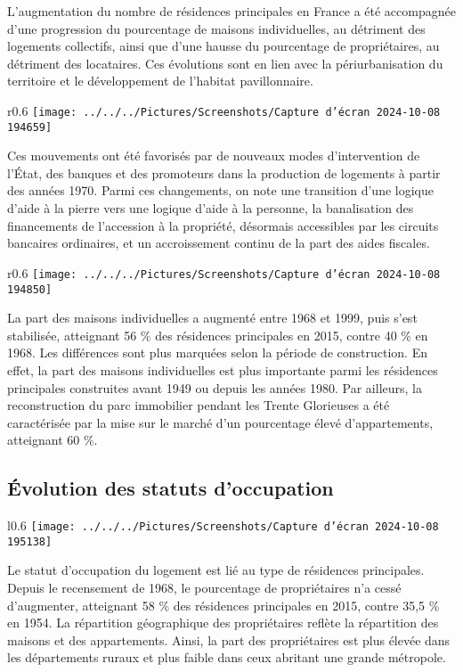 \documentclass[a4paper, 12pt]{report}
\begin{document}
L'augmentation du nombre de résidences principales en France a été accompagnée d'une progression du pourcentage de maisons individuelles, au détriment des logements collectifs, ainsi que d'une hausse du pourcentage de propriétaires, au détriment des locataires. Ces évolutions sont en lien avec la périurbanisation du territoire et le développement de l'habitat pavillonnaire. 
\begin{wrapfigure}{r}{0.6\textwidth}
	\centering
\texttt{[image: ../../../Pictures/Screenshots/Capture d'écran 2024-10-08 194659]}
\end{wrapfigure}
Ces mouvements ont été favorisés par de nouveaux modes d'intervention de l'État, des banques et des promoteurs dans la production de logements à partir des années 1970. Parmi ces changements, on note une transition d'une logique d'aide à la pierre vers une logique d'aide à la personne, la banalisation des financements de l'accession à la propriété, désormais accessibles par les circuits bancaires ordinaires, et un accroissement continu de la part des aides fiscales.
\newpage
\begin{wrapfigure}{r}{0.6\textwidth}
	\centering
\texttt{[image: ../../../Pictures/Screenshots/Capture d'écran 2024-10-08 194850]}
\end{wrapfigure}
La part des maisons individuelles a augmenté entre 1968 et 1999, puis s'est stabilisée, atteignant 56 \% des résidences principales en 2015, contre 40 \% en 1968. Les différences sont plus marquées selon la période de construction. En effet, la part des maisons individuelles est plus importante parmi les résidences principales construites avant 1949 ou depuis les années 1980. Par ailleurs, la reconstruction du parc immobilier pendant les Trente Glorieuses a été caractérisée par la mise sur le marché d'un pourcentage élevé d'appartements, atteignant 60 \%.

\subsection{Évolution des statuts d'occupation}
\begin{wrapfigure}{l}{0.6\textwidth}
	\centering
\texttt{[image: ../../../Pictures/Screenshots/Capture d'écran 2024-10-08 195138]}
\end{wrapfigure}
Le statut d'occupation du logement est lié au type de résidences principales. Depuis le recensement de 1968, le pourcentage de propriétaires n'a cessé d'augmenter, atteignant 58 \% des résidences principales en 2015, contre 35,5 \% en 1954. La répartition géographique des propriétaires reflète la répartition des maisons et des appartements. Ainsi, la part des propriétaires est plus élevée dans les départements ruraux et plus faible dans ceux abritant une grande métropole.
\end{document}
